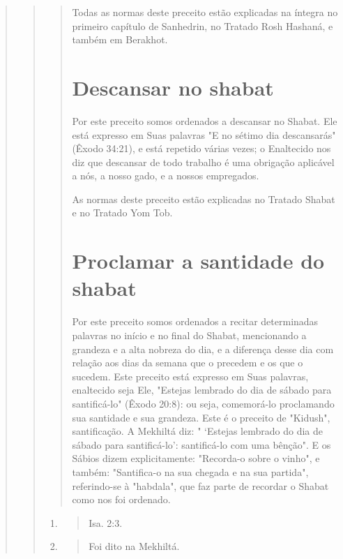 \begin{quote}
\begin{quote}
\begin{quote}
Todas as normas deste preceito estão explicadas na íntegra no pri­meiro
capítulo de Sanhedrin, no Tratado Rosh Hashaná, e também em Berakhot.

\section{Descansar no shabat}

Por este preceito somos ordenados a descansar no Shabat. Ele está
expresso em Suas palavras "E no sétimo dia descansarás" (Êxodo 34:21), e
está repetido várias vezes; o Enaltecido nos diz que descansar de todo
trabalho é uma obrigação aplicável a nós, a nosso gado, e a nossos
empregados.

As normas deste preceito estão explicadas no Tratado Shabat e no Tratado
Yom Tob.

\section{Proclamar a santidade do shabat}

Por este preceito somos ordenados a recitar determinadas palavras no
início e no final do Shabat, mencionando a grandeza e a alta nobreza do
dia, e a diferença desse dia com relação aos dias da semana que o
precedem e os que o sucedem. Este preceito está expresso em Suas
palavras, enaltecido seja Ele, "Estejas lembrado do dia de sábado para
santificá-lo" (Êxodo 20:8): ou seja, comemorá-lo proclamando sua
santidade e sua grandeza. Este é o pre­ceito de "Kidush", santificação.
A Mekhiltá diz: " `Estejas lembrado do dia de sábado para santificá-lo':
santificá-lo com uma bênção". E os Sábios dizem ex­plicitamente:
"Recorda-o sobre o vinho", e também: "Santifica-o na sua chega­da e na
sua partida", referindo-se à "habdala", que faz parte de recordar o
Sha­bat como nos foi ordenado.
\end{quote}

\begin{enumerate}
\def\labelenumi{\arabic{enumi}.}
\setcounter{enumi}{180}
\item
 \begin{quote}
 Isa. 2:3.
 \end{quote}
\item
 \begin{quote}
 Foi dito na Mekhiltá.
 \end{quote}
\end{enumerate}

\begin{quote}



\end{quote}
\end{quote}
\end{quote}
